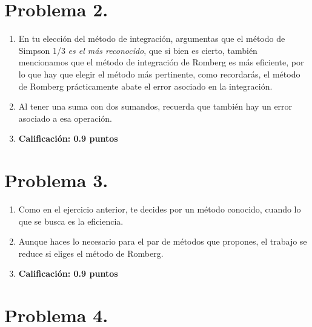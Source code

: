 \section{Problema 2.}

\begin{enumerate}
\item En tu elección del método de integración, argumentas que el método de Simpson 1/3 \emph{es el más reconocido}, que si bien es cierto, también mencionamos que el método de integración de Romberg es más eficiente, por lo que hay que elegir el método más pertinente, como recordarás, el método de Romberg prácticamente abate el error asociado en la integración.
\item Al tener una suma con dos sumandos, recuerda que también hay un error asociado a esa operación.
\item \textbf{Calificación: 0.9 puntos}
\end{enumerate}

\section{Problema 3.}

\begin{enumerate}
\item Como en el ejercicio anterior, te decides por un método conocido, cuando lo que se busca es la eficiencia.
\item Aunque haces lo necesario para el par de métodos que propones, el trabajo se reduce si eliges el método de Romberg.
\item \textbf{Calificación: 0.9 puntos}
\end{enumerate}

\section{Problema 4.}


